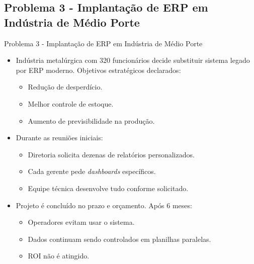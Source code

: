 \documentclass{beamer}
\begin{document}
\subsection{Problema 3 - Implantação de ERP em Indústria de Médio Porte}

\begin{frame}{Problema 3 - Implantação de ERP em Indústria de Médio Porte}
	\begin{itemize}
		\justifying
		\item Indústria metalúrgica com 320 funcionários decide substituir sistema legado por ERP moderno. Objetivos estratégicos declarados:
			\begin{itemize}
				\item Redução de desperdício.
				\item Melhor controle de estoque.
				\item Aumento de previsibilidade na produção.
			\end{itemize}
		\item Durante as reuniões iniciais:
			\begin{itemize}
				\item Diretoria solicita dezenas de relatórios personalizados.
				\item Cada gerente pede \textit{dashboards} específicos.
				\item Equipe técnica desenvolve tudo conforme solicitado.
			\end{itemize}
		\item Projeto é concluído no prazo e orçamento. Após 6 meses:
			\begin{itemize}
				\justifying
				\item Operadores evitam usar o sistema.
				\item Dados continuam sendo controlados em planilhas paralelas.
				\item ROI não é atingido.
			\end{itemize}
	\end{itemize}
\end{frame}
\end{document}
